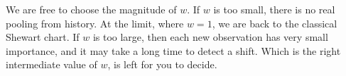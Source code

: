 

We are free to choose the magnitude of $w$. 
If $w$ is too small, there is no real pooling from history. At the limit, where $w=1$, we are back to the classical Shewart chart. 
If $w$ is too large, then each new observation has very small importance, and it may take a long time to detect a shift.
Which is the right intermediate value of $w$, is left for you to decide.







